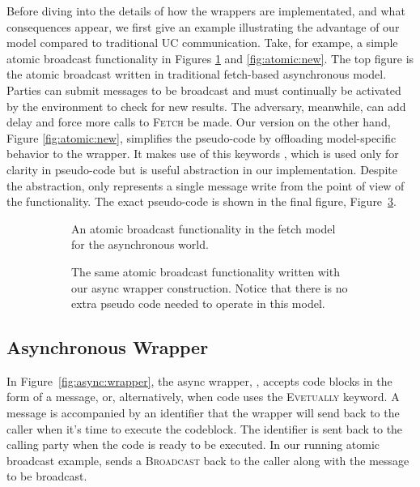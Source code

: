 Before diving into the details of how the wrappers are implementated, and what consequences appear, we first give an example illustrating the advantage of our model compared to traditional UC communication.
Take, for exampe, a simple atomic broadcast functionality in Figures \ref{fig:atomic:old} and \ref{fig:atomic:new}. 
The top figure is the atomic broadcast written in traditional fetch-based asynchronous model.
Parties can submit messages to be broadcast and must continually be activated by the environment to check for new results. 
The adversary, meanwhile, can add delay and force more calls to \textsc{Fetch} be made.
Our version on the other hand, Figure \ref{fig:atomic:new}, simplifies the pseudo-code by offloading model-specific behavior to the wrapper.
It makes use of this keywords \Eventually, which is used only for clarity in pseudo-code but is useful abstraction in our implementation.
Despite the abstraction, \Eventually only represents a single message write from the point of view of the functionality.
The exact pseudo-code is shown in the final figure, Figure~\ref{fig:atomic:real}.

\begin{figure}[h]
\begin{subfigure}{\columnwidth}
	
	\caption{An atomic broadcast functionality in the fetch model for the asynchronous world.}
	\label{fig:atomic:old}
\end{subfigure}
\begin{subfigure}{\columnwidth}
	
	\caption{The same atomic broadcast functionality written with our async wrapper construction. Notice that there is no extra pseudo code needed to operate in this model.}
\end{subfigure}
\begin{subfigure}{\columnwidth}
	
	\label{fig:atomic:real}
\end{subfigure}
\end{figure}


\subsection{Asynchronous Wrapper}
In Figure~\ref{fig:async:wrapper}, the async wrapper, \Wasync, accepts code blocks in the form of a  message, or, alternatively, when code uses the \textsc{Evetually} keyword.
A  message is accompanied by an identifier that the wrapper will send back to the caller when it's time to execute the codeblock.
The identifier is sent back to the calling party when the code is ready to be executed. 
In our running atomic broadcast example, \Wasync sends a \textsc{Broadcast} back to the caller along with the message to be broadcast.


